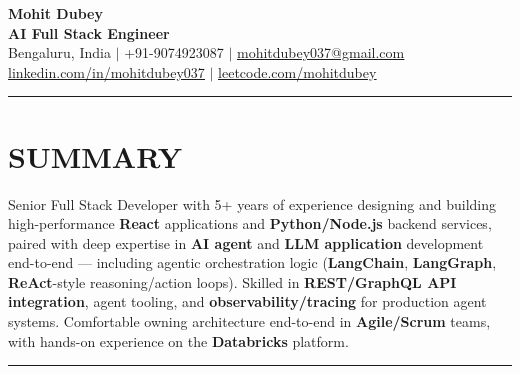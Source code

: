 \documentclass[100pt,a4paper]{article}
\newcommand{\sectionline}{
\begin{center}
\vspace{-10pt}
\rule{1\textwidth}{0.5pt}
\end{center}
\vspace{1pt}
}
\begin{document}
\begin{center}
    {\Huge\bfseries Mohit Dubey} \\ \vspace{4pt}
    \textbf{AI Full Stack Engineer } \\ \vspace{6pt}
    \small Bengaluru, India $|$ +91-9074923087 $|$ \href{mailto:mohitdubey037@gmail.com}{\underline{mohitdubey037@gmail.com}} \\
    \href{https://www.linkedin.com/in/mohit-dubey-037/}{\underline{linkedin.com/in/mohitdubey037}} $|$ \href{https://leetcode.com/u/mohitdubey037/}
    {\underline{leetcode.com/mohitdubey}}
\end{center}



\sectionline
\section*{SUMMARY}
Senior Full Stack Developer with 5+ years of experience designing and building high-performance \textbf{React} applications and \textbf{Python/Node.js} backend services, paired with deep expertise in \textbf{AI agent} and \textbf{LLM application} development end-to-end — including agentic orchestration logic (\textbf{LangChain}, \textbf{LangGraph}, \textbf{ReAct}-style reasoning/action loops). Skilled in \textbf{REST/GraphQL API integration}, agent tooling, and \textbf{observability/tracing} for production agent systems. Comfortable owning architecture end-to-end in \textbf{Agile/Scrum} teams, with hands-on experience on the \textbf{Databricks} platform.




\sectionline
\end{document}
